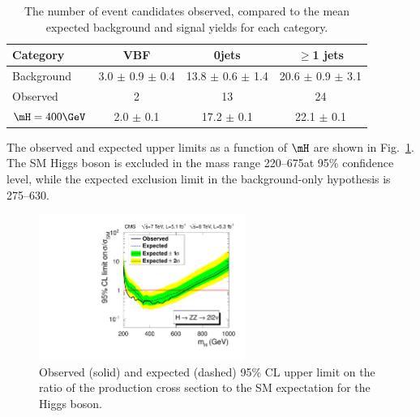 \begin{table}[htbp]
\begin{center}
\caption{
The number of event candidates observed, compared to the mean expected 
background and signal yields for each category.
}
\label{tab:final_yields}
\begin{tabular}{l|c|c|c}
\hline
Category & VBF & 0jets & $\geq$1 jets \\
\hline
Background &  3.0 $\pm$ 0.9 $\pm$ 0.4 &  13.8 $\pm$ 0.6 $\pm$ 1.4  &  20.6 $\pm$ 0.9 $\pm$ 3.1 \\ %
\hline
Observed  & 2 & 13  & 24 \\ %
\hline
$\mH = 400\GeV$ & 2.0 $\pm$ 0.1 & 17.2 $\pm$ 0.1 & 22.1 $\pm$ 0.1 \\ %
\hline
\end{tabular}
\end{center}
\end{table}

The observed and expected 
upper limits 
as a function of $\mH$ are shown in Fig.~\ref{fig:limits_SM}.
The SM Higgs boson is excluded
in the mass range 220--675\GeV at 95\% confidence level, while the
expected exclusion limit in the background-only hypothesis is 275--630\GeV.

\begin{figure}[htbp]
\begin{center}
\includegraphics[width=0.6\textwidth]{figures/ZZ2l2nuLimit.pdf}
\caption{Observed (solid) and expected
(dashed) 95\% CL upper limit on the ratio of the production cross
section to the SM expectation for the Higgs boson.
} 
\label{fig:limits_SM}
\end{center}
\end{figure}
